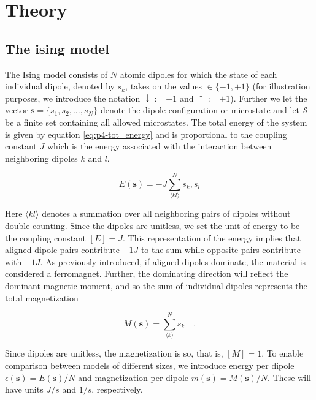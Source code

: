 \documentclass[../main_proj4_correct_template.tex]{subfiles}
\begin{document}
\section{Theory}\label{sec:p4theory}

\subsection{The ising model}

The Ising model consists of $N$ atomic dipoles for which the state of each individual dipole, denoted by $s_k$, takes on the values $\in \{-1, +1\}$ (for illustration purposes, we introduce the notation $\downarrow := -1$ and $\uparrow := +1$). Further we let the vector $\mathbf{s} = \{s_1, s_2, \dots, s_N\}$ denote the dipole configuration or microstate and let $\mathcal{S}$ be a finite set containing all allowed microstates. The total energy of the system is given by equation \eqref{eq:p4-tot_energy} and is proportional to the coupling constant $J$ which is the energy associated with the interaction between neighboring dipoles $k$ and $l$. 

\begin{equation}
\label{eq:p4-tot_energy}
    E(\mathbf{s}) = -J \sum\limits_{\langle kl \rangle}^N s_k, s_l 
\end{equation}

\noindent Here $\langle kl \rangle$ denotes a summation over all neighboring pairs of dipoles without double counting. Since the dipoles are unitless, we set the unit of energy to be the coupling constant $[E] = J$. This representation of the energy implies that aligned dipole pairs contribute $-1J$ to the sum while opposite pairs contribute with $+1J$. As previously introduced, if aligned dipoles dominate, the material is considered a ferromagnet. Further, the dominating direction will reflect the dominant magnetic moment, and so the sum of individual dipoles represents the total magnetization

\begin{equation}
\label{eq:p4_magnetization}
    M(\mathbf{s}) = \sum\limits_{\langle k \rangle}^N  s_k \quad. 
\end{equation}

\noindent Since dipoles are unitless, the magnetization is so, that is, $[M] = 1$. To enable comparison between models of different sizes, we introduce energy per dipole $\epsilon(\mathbf{s}) = E(\mathbf{s})/N$ and magnetization per dipole $m(\mathbf{s}) = M(\mathbf{s})/N$. These will have units $J/s$ and $1/s$, respectively. 
\end{document}
